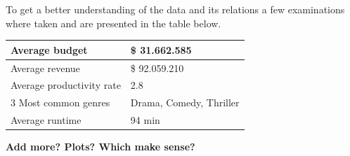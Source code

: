 To get a better understanding of the data and its relations a few examinations where taken and are presented in the table below.
\begin{center}
	\begin{tabular}{| l | l |}
	\hline
	Average budget & \$ 31.662.585 \\ \hline
	Average revenue & \$ 92.059.210 \\ \hline
	Average productivity rate & 2.8 \\ \hline
	3 Most common genres & Drama, Comedy, Thriller \\ \hline
	Average runtime & 94 min \\ \hline
	\end{tabular}
\end{center} 

\textbf{Add more? Plots? Which make sense?}
